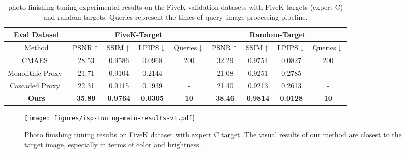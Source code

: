 \documentclass{article}
\newcommand{\pipeline}{image processing pipeline\xspace}
\newcommand{\taskPFT}{photo finishing tuning\xspace}
\newcommand{\TaskPFT}{Photo finishing tuning\xspace}
\begin{document}
\begin{table}[t]
\caption{\taskPFT experimental results on the FiveK validation datasets with FiveK targets (expert-C) and random targets. Queries represent the times of query~\pipeline.}
\label{exp:main}

\centering
\setlength\tabcolsep{3pt}%
\renewcommand\arraystretch{1}%
\begin{adjustbox}{width=\linewidth,center=\linewidth}
\begin{tabular}{c|cccc|cccc}
\toprule

\multicolumn{1}{c|}{Eval Dataset}    & \multicolumn{4}{c|}{FiveK-Target}    & \multicolumn{4}{c}{Random-Target}     \\ \midrule%

Method & PSNR$\uparrow$ & SSIM$\uparrow$ & LPIPS$\downarrow$ & Queries$\downarrow$ & PSNR$\uparrow$ & SSIM$\uparrow$ & LPIPS$\downarrow$ & Queries$\downarrow$ \\ \midrule

CMAES~\cite{hansen2006cma, mosleh2020hardware}  & 28.53 & 0.9586 & 0.0968 & 200 &32.29   &0.9754  & 0.0827 & 200 \\
Monolithic Proxy~\cite{tseng2019hyperparameter}       & 21.71 & 0.9104 & 0.2144 & - &21.08 & 0.9251 & 0.2785 & - \\
Cascaded Proxy~\cite{tseng2022neural}   &22.31  & 0.9115  & 0.1939 & - &21.40 &0.9213 & 0.2613 & - \\
\textbf{Ours}  & \textbf{35.89} & \textbf{0.9764}  &  \textbf{0.0305} & \textbf{10} & \textbf{38.46} & \textbf{0.9814} & \textbf{0.0128} & \textbf{10} \\
\bottomrule
\end{tabular}
\end{adjustbox}
\vspace{-0.2cm}
\label{tab:main}
\end{table}


\begin{figure}[t]
\centering
  \texttt{[image: figures/isp-tuning-main-results-v1.pdf]}
  \caption{\TaskPFT results on FiveK dataset with expert C target. The visual results of our method are closest to the target image, especially in terms of color and brightness.}
  \label{fig:pft_vis}
\end{figure}
\end{document}

